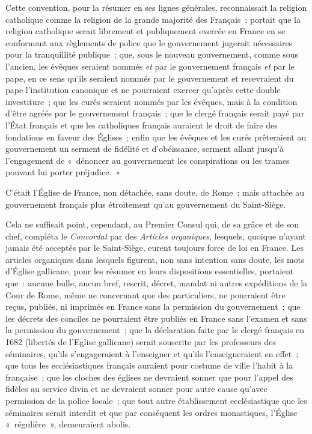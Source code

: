 \documentclass[french,twoside]{book} %
\begin{document}
Cette convention, pour la résumer en ses lignes générales, reconnaissait la religion catholique comme la religion de la grande majorité des Français ; portait que la religion catholique serait librement et publiquement exercée en France en se conformant aux règlements de police que le gouvernement jugerait nécessaires pour la tranquillité publique ; que, sous le nouveau gouvernement, comme sous l’ancien, les évêques seraient nommés {\itshape et} par le gouvernement français {\itshape et} par le  pape, en ce sens qu’ils seraient nommés par le gouvernement et recevraient du pape l’institution canonique et ne pourraient exercer qu’après cette double investiture ; que les curés seraient nommés par les évêques, mais à la condition d’être agréés par le gouvernement français ; que le clergé français serait payé par l’État français et que les catholiques français auraient le droit de faire des fondations en faveur des Églises ; enfin que les évêques et les curés prêteraient au gouvernement un serment de fidélité et d’obéissance, serment allant jusqu’à l’engagement de « dénoncer au gouvernement les conspirations ou les trames pouvant lui porter préjudice. »\par
C’était l’Église de France, non détachée, sans doute, de Rome ; mais attachée au gouvernement français plus étroitement qu’au gouvernement du Saint-Siège.\par
Cela ne suffisait point, cependant, au Premier Consul qui, de sa grâce et de son chef, compléta le {\itshape Concordat} par des \emph{Articles organiques}, lesquels, quoique n’ayant jamais été acceptés par le Saint-Siège, eurent toujours force de loi en France. Les articles organiques dans lesquels figurent, non sans intention sans doute, les mots d’Église gallicane, pour les résumer en leurs dispositions essentielles, portaient que : aucune bulle, aucun bref, rescrit,  décret, mandat ni autres expéditions de la Cour de Rome, même ne concernant que des particuliers, ne pourraient être reçus, publiés, ni imprimés en France sans la permission du gouvernement ; que les décrets des conciles ne pourraient être publiés en France sans l’examen et sans la permission du gouvernement ; que la déclaration faite par le clergé français en 1682 (libertés de l’Eglise gallicane) serait souscrite par les professeurs des séminaires, qu’ils s’engageraient à l’enseigner et qu’ils l’enseigneraient en effet ; que tous les ecclésiastiques français auraient pour costume de ville l’habit à la française ; que les cloches des églises ne devraient sonner que pour l’appel des fidèles au service divin et ne devraient sonner pour autre cause qu’avec permission de la police locale ; que tout autre établissement ecclésiastique que les séminaires serait interdit et que par conséquent les ordres monastiques, l’Église « régulière », demeuraient abolis.\par
\end{document}
